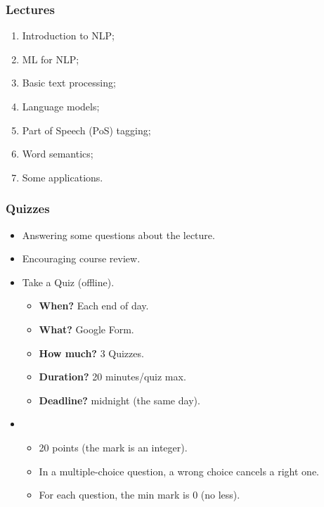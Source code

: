 \documentclass{beamer}
\begin{document}
\begin{frame}
\frametitle{Lectures}

\begin{enumerate}
	\item Introduction to NLP;
	\item ML for NLP;
	\item Basic text processing;
	\item Language models;
	\item Part of Speech (PoS) tagging;
	\item Word semantics;
	\item Some applications.
\end{enumerate}

\end{frame}

\begin{frame}
	\frametitle{Quizzes}
	
	\begin{itemize}
		\item Answering some questions about the lecture.
		\item {} Encouraging course review.
		\item {} Take a Quiz (offline).
		\begin{itemize}
			\item \textbf{When?} Each end of day.
			\item \textbf{What?} Google Form.
			\item \textbf{How much?} 3 Quizzes.
			\item \textbf{Duration?} 20 minutes/quiz max.
			\item \textbf{Deadline?} midnight (the same day).
		\end{itemize}
		\item {}
		\begin{itemize}
			\item 20 points (the mark is an integer).
			\item In a multiple-choice question, a wrong choice cancels a right one.
			\item For each question, the min mark is 0 (no less).
		\end{itemize}
	\end{itemize}
	
\end{frame}
\end{document}
